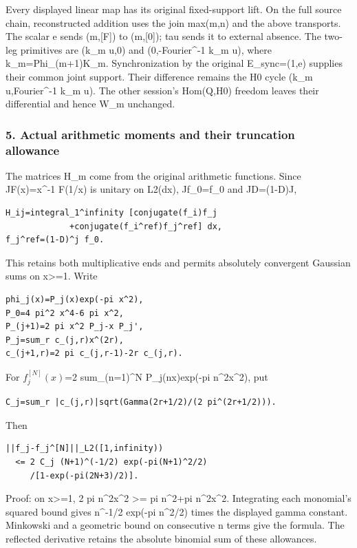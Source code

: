 Every displayed linear map has its original fixed-support lift. On the full source chain,
reconstructed addition uses the join max(m,n) and the above transports. The scalar e sends
(m,{[}F{]}) to (m,{[}0{]}); tau sends it to external absence. The two-leg primitives are (k\_m u,0)
and (0,-Fourier\^{}-1 k\_m u), where k\_m=Phi\_(m+1)K\_m. Synchronization by the original
E\_sync=(1,e) supplies their common joint support. Their difference remains the H0 cycle (k\_m
u,Fourier\^{}-1 k\_m u). The other session's Hom(Q,H0) freedom leaves their differential and hence
W\_m unchanged.

\subsubsection{5. Actual arithmetic moments and their truncation
allowance}\label{pr_13:actual-arithmetic-moments-and-their-truncation-allowance}

The matrices H\_m come from the original arithmetic functions. Since JF(x)=x\^{}-1 F(1/x) is unitary
on L2(dx), Jf\_0=f\_0 and JD=(1-D)J,

\begin{verbatim}
H_ij=integral_1^infinity [conjugate(f_i)f_j
             +conjugate(f_i^ref)f_j^ref] dx,
f_j^ref=(1-D)^j f_0.
\end{verbatim}

This retains both multiplicative ends and permits absolutely convergent Gaussian sums on
x\textgreater=1. Write

\begin{verbatim}
phi_j(x)=P_j(x)exp(-pi x^2),
P_0=4 pi^2 x^4-6 pi x^2,
P_(j+1)=2 pi x^2 P_j-x P_j',
P_j=sum_r c_(j,r)x^(2r),
c_(j+1,r)=2 pi c_(j,r-1)-2r c_(j,r).
\end{verbatim}

For \(f_j^{[N]}(x)\)=2 sum\_(n=1)\^{}N P\_j(nx)exp(-pi n\^{}2x\^{}2), put

\begin{verbatim}
C_j=sum_r |c_(j,r)|sqrt(Gamma(2r+1/2)/(2 pi^(2r+1/2))).
\end{verbatim}

Then

\begin{verbatim}
||f_j-f_j^[N]||_L2([1,infinity))
  <= 2 C_j (N+1)^(-1/2) exp(-pi(N+1)^2/2)
     /[1-exp(-pi(2N+3)/2)].
\end{verbatim}

Proof: on x\textgreater=1, 2 pi n\^{}2x\^{}2 \textgreater= pi n\^{}2+pi n\^{}2x\^{}2. Integrating
each monomial's squared bound gives n\^{}-1/2 exp(-pi n\^{}2/2) times the displayed gamma constant.
Minkowski and a geometric bound on consecutive n terms give the formula. The reflected derivative
retains the absolute binomial sum of these allowances.

